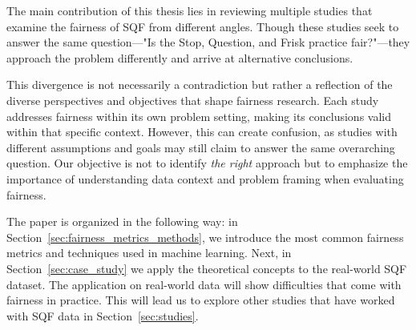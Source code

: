 The main contribution of this thesis lies in reviewing multiple studies that examine the fairness of SQF from different angles. Though these studies seek to answer the same question—"Is the Stop, Question, and Frisk practice fair?"—they approach the problem differently and arrive at alternative conclusions.\par
This divergence is not necessarily a contradiction but rather a reflection of the diverse perspectives and objectives that shape fairness research. Each study addresses fairness within its own problem setting, making its conclusions valid within that specific context. However, this can create confusion, as studies with different assumptions and goals may still claim to answer the same overarching question. Our objective is not to identify \textit{the right} approach but to emphasize the importance of understanding data context and problem framing when evaluating fairness.\par
The paper is organized in the following way: in Section~\ref{sec:fairness_metrics_methods}, we introduce the most common fairness metrics and techniques used in machine learning.
Next, in Section~\ref{sec:case_study} we apply the theoretical concepts to the real-world SQF dataset. 
The application on real-world data will show difficulties that come with fairness in practice.
This will lead us to explore other studies that have worked with SQF data in Section~\ref{sec:studies}. 


